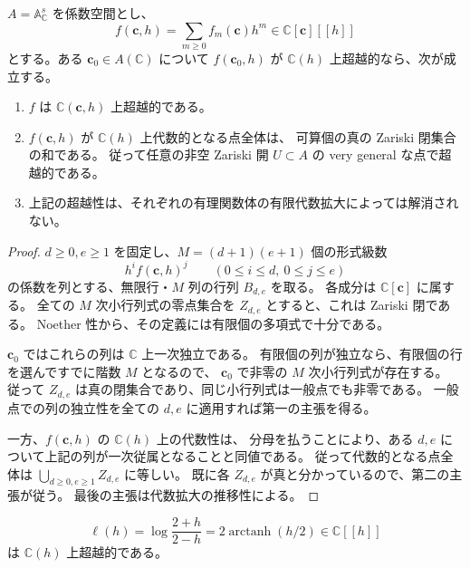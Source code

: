 \begin{proposition}
\label{prop:nfm-very-general-transcendence}
$A=\mathbb A^s_{\mathbb C}$ を係数空間とし、
\[
 f(\mathbf c,h)=\sum_{m\ge0}f_m(\mathbf c)h^m
       \in\mathbb C[\mathbf c][[h]]
\]
とする。ある $\mathbf c_0\in A(\mathbb C)$ について
$f(\mathbf c_0,h)$ が $\mathbb C(h)$ 上超越的なら、次が成立する。
\begin{enumerate}
\item $f$ は $\mathbb C(\mathbf c,h)$ 上超越的である。
\item $f(\mathbf c,h)$ が $\mathbb C(h)$ 上代数的となる点全体は、
可算個の真の Zariski 閉集合の和である。
従って任意の非空 Zariski 開 $U\subset A$ の very general な点で超越的である。
\item 上記の超越性は、それぞれの有理関数体の有限代数拡大によっては解消されない。
\end{enumerate}
\end{proposition}

\begin{proof}
$d\ge0,e\ge1$ を固定し、$M=(d+1)(e+1)$ 個の形式級数
\[
 h^if(\mathbf c,h)^j\qquad(0\le i\le d,\ 0\le j\le e)
\]
の係数を列とする、無限行・$M$ 列の行列 $B_{d,e}$ を取る。
各成分は $\mathbb C[\mathbf c]$ に属する。
全ての $M$ 次小行列式の零点集合を $Z_{d,e}$ とすると、これは Zariski 閉である。
Noether 性から、その定義には有限個の多項式で十分である。

$\mathbf c_0$ ではこれらの列は $\mathbb C$ 上一次独立である。
有限個の列が独立なら、有限個の行を選んですでに階数 $M$ となるので、
$\mathbf c_0$ で非零の $M$ 次小行列式が存在する。
従って $Z_{d,e}$ は真の閉集合であり、同じ小行列式は一般点でも非零である。
一般点での列の独立性を全ての $d,e$ に適用すれば第一の主張を得る。

一方、$f(\mathbf c,h)$ の $\mathbb C(h)$ 上の代数性は、
分母を払うことにより、ある $d,e$ について上記の列が一次従属となることと同値である。
従って代数的となる点全体は
$\bigcup_{d\ge0,e\ge1}Z_{d,e}$ に等しい。
既に各 $Z_{d,e}$ が真と分かっているので、第二の主張が従う。
最後の主張は代数拡大の推移性による。
\end{proof}

\begin{lemma}
\label{lem:nfm-logarithmic-specialization-transcendental}
\[
 \ell(h)=\log\frac{2+h}{2-h}=2\operatorname{arctanh}(h/2)
       \in\mathbb C[[h]]
\]
は $\mathbb C(h)$ 上超越的である。
\end{lemma}

